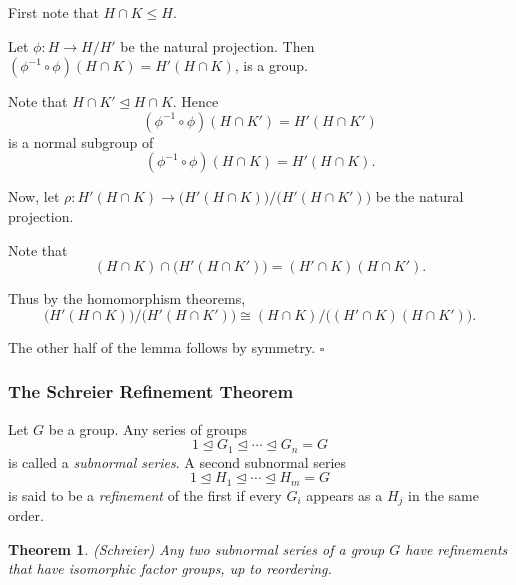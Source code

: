 \documentclass[10pt]{article}
\newtheorem{theorem}{Theorem}[section]
\newenvironment{proof}[1][Proof]{\begin{trivlist}
\item[\hskip \labelsep {\itshape #1}]}{\end{trivlist}}
\newenvironment{definition}[1][Definition]{\begin{trivlist}
\item[\hskip \labelsep {\bfseries #1}]}{\end{trivlist}}
\begin{document}
\begin{proof}
First note that $H \cap K \leq H$.

Let $\phi : H \to H/H'$ be the natural projection. Then $(\phi^{-1}\circ \phi)(H\cap K) = H'(H \cap K)$, is a group.

Note that $H \cap K' \mathrel{\unlhd} H \cap K$. Hence
$$(\phi^{-1}\circ \phi)(H\cap K') = H'(H\cap K')$$
is a normal subgroup of
$$(\phi^{-1}\circ \phi)(H\cap K) = H'(H\cap K).$$

Now, let $\rho : H'(H\cap K) \to \bigl(H'(H\cap K)\bigr)/ \bigl(H'(H\cap K')\bigr)$ be the natural projection.

Note that
$$(H\cap K)\cap \bigl(H'(H\cap K')\bigr) = (H'\cap K)(H \cap K').$$

Thus by the homomorphism theorems,
$$\bigl(H'(H\cap K)\bigr)/\bigl(H'(H\cap K')\bigr) \cong (H\cap K)/\bigl((H'\cap K)(H \cap K')\bigr).$$

The other half of the lemma follows by symmetry. $\square$
\end{proof}

\subsubsection{The Schreier Refinement Theorem}

\begin{definition}
Let $G$ be a group. Any series of groups
$$1 \mathrel{\unlhd} G_1 \mathrel{\unlhd} \cdots \mathrel{\unlhd} G_n = G$$
is called a \emph{subnormal series}.
A second subnormal series
$$1 \mathrel{\unlhd} H_1 \mathrel{\unlhd} \cdots \mathrel{\unlhd} H_m = G$$
is said to be a \emph{refinement} of the first if every $G_i$ appears as a $H_j$ in the same order.
\end{definition}

\begin{theorem} (Schreier)
Any two subnormal series of a group $G$ have refinements that have isomorphic factor groups, up to reordering.
\end{theorem}
\end{document}
